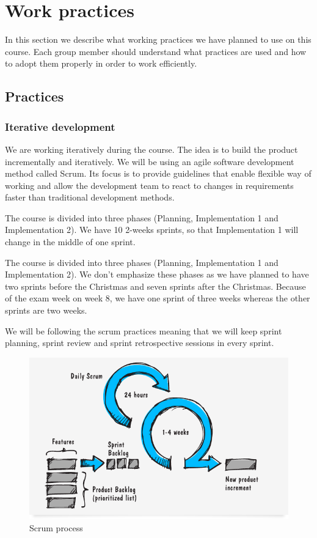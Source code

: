 \section{Work practices}

In this section we describe what working practices we have planned to use on
this course. Each group member should understand what practices are used and
how to adopt them properly in order to work efficiently.

\subsection{Practices}
\subsubsection{Iterative development}

We are working iteratively during the course. The idea is to build the product
incrementally and iteratively. We will be using an agile software development
method called Scrum. Its focus is to provide guidelines that enable flexible
way of working and allow the development team to react to changes in
requirements faster than traditional development methods.

The course is divided into three phases (Planning, Implementation 1 and
Implementation 2). We have 10 2-weeks sprints, so that Implementation 1 will
change in the middle of one sprint.

The course is divided into three phases (Planning, Implementation 1 and
Implementation 2). We don't emphasize these phases as we have planned to have
two sprints before the Christmas and seven sprints after the Christmas. Because
of the exam week on week 8, we have one sprint of three weeks whereas the other
sprints are two weeks.

We will be following the scrum practices meaning that we will keep sprint
planning, sprint review and sprint retrospective sessions in every sprint.

\begin{figure}[H]
\centering
\includegraphics[width=1\textwidth]{imgs/scrum_process_en.png}
\caption{Scrum process}
\label{fig:scrum}
\end{figure}

